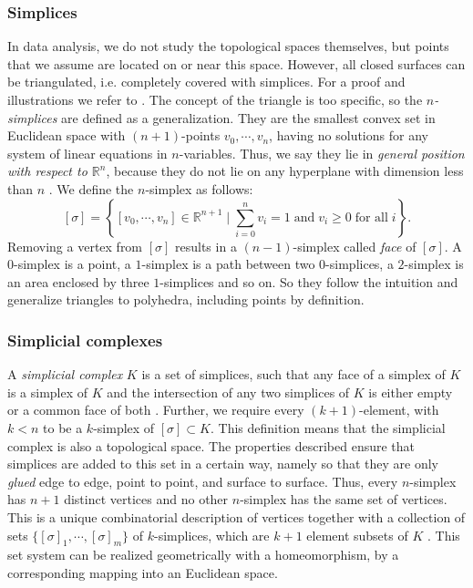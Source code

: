 \documentclass[runningheads,orivec]{llncs}
\begin{document}
\subsubsection{Simplices} In data analysis, we do not study the topological spaces themselves, but points that we assume are located on or near this space. However, all closed surfaces can be triangulated, i.e. completely covered with simplices. For a proof and illustrations we refer to \cite[p.~102]{hatcher2002algebraic,lume}. The concept of the triangle is too specific, so the \emph{$n$-simplices} are defined as a generalization. They are the smallest convex set in Euclidean space with $(n+1)$-points $v_0,\cdots,v_n$, having no solutions for any system of linear equations in $n$-variables. Thus, we say they lie in \emph{general position with respect to $\mathbb{R}^n$}, because they do not lie on any hyperplane with dimension less than $n$ \cite[p.~103]{hatcher2002algebraic}. We define the $n$-simplex as follows:
\begin{equation}
    \label{simplex}
    [\sigma] = \left\{ [v_0,\cdots,v_n] \in \mathbb{R}^{n+1} \; \bigg\vert \; \sum_{i=0}^{n} v_i = 1 \; \text{and} \; v_i \geq 0 \; \text{for all} \; i \right\}.
\end{equation}
Removing a vertex from $[\sigma]$ results in a $(n-1)$-simplex called \emph{face} of $[\sigma]$. A $0$-simplex is a point, a $1$-simplex is a path between two $0$-simplices, a $2$-simplex is an area enclosed by three $1$-simplices and so on. So they follow the intuition and generalize triangles to polyhedra, including points by definition.


\subsubsection{Simplicial complexes} A \emph{simplicial complex} $K$ is a set of simplices, such that any face of a simplex of $K$ is a simplex of $K$ and the intersection of any two simplices of $K$ is either empty or a common face of both \cite[p.~11]{boissonnat2018geometric}. Further, we require every $(k+1)$-element, with $k < n$ to be a $k$-simplex of $[\sigma] \subset K$. This definition means that the simplicial complex is also a topological space. The properties described ensure that simplices are added to this set in a certain way, namely so that they are only \emph{glued} edge to edge, point to point, and surface to surface. Thus, every $n$-simplex has $n+1$ distinct vertices and no other $n$-simplex has the same set of vertices.  This is a unique combinatorial description of vertices together with a collection of sets $\{[\sigma]_1, \cdots, [\sigma]_m\}$ of $k$-simplices, which are $k+1$ element subsets of $K$ \cite[p.~107]{hatcher2002algebraic}. This set system can be realized geometrically with a homeomorphism, by a corresponding mapping into an Euclidean space.
\end{document}

